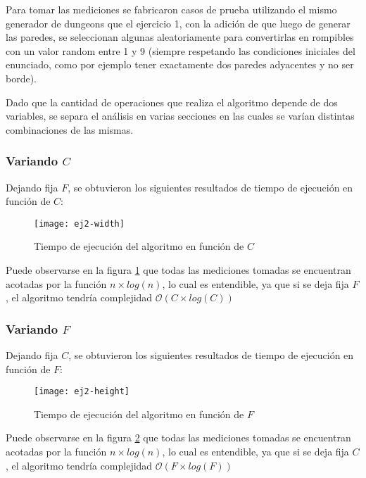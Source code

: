 Para tomar las mediciones se fabricaron casos de prueba utilizando el mismo generador de dungeons que el ejercicio 1, con la adición de que luego de generar las paredes, se seleccionan algunas aleatoriamente para convertirlas en rompibles con un valor random entre 1 y 9 (siempre respetando las condiciones iniciales del enunciado, como por ejemplo tener exactamente dos paredes adyacentes y no ser borde).

Dado que la cantidad de operaciones que realiza el algoritmo depende de dos variables, se separa el análisis en varias secciones en las cuales se varían distintas combinaciones de las mismas.

\subsubsection{Variando $C$}

Dejando fija $F$, se obtuvieron los siguientes resultados de tiempo de ejecución en función de $C$:

\begin{figure}[H]
	\centering
	\texttt{[image: ej2-width]}
	\caption{Tiempo de ejecución del algoritmo en función de $C$}
	\label{fig:ej2-width-fig}
\end{figure}

Puede observarse en la figura \ref{fig:ej2-width-fig} que todas las mediciones tomadas se encuentran acotadas por la función $n \times log(n)$, lo cual es entendible, ya que si se deja fija $F$, el algoritmo tendría complejidad $\mathcal{O}(C \times log(C))$

\subsubsection{Variando $F$}

Dejando fija $C$, se obtuvieron los siguientes resultados de tiempo de ejecución en función de $F$:

\begin{figure}[H]
	\centering
	\texttt{[image: ej2-height]}
	\caption{Tiempo de ejecución del algoritmo en función de $F$}
	\label{fig:ej2-height-fig}
\end{figure}

Puede observarse en la figura \ref{fig:ej2-height-fig} que todas las mediciones tomadas se encuentran acotadas por la función $n \times log(n)$, lo cual es entendible, ya que si se deja fija $C$, el algoritmo tendría complejidad $\mathcal{O}(F \times log(F))$

